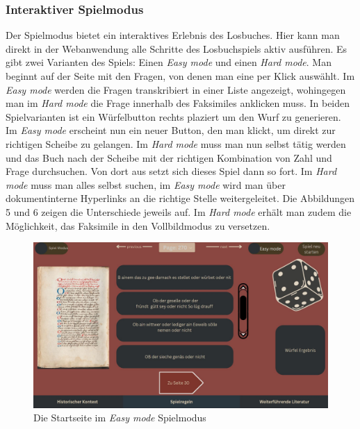 \documentclass[12pt,a4paper]{article}
\begin{document}
		\subsubsection{Interaktiver Spielmodus}
		Der Spielmodus bietet ein interaktives Erlebnis des Losbuches. Hier kann man direkt in der Webanwendung alle Schritte des Losbuchspiels aktiv ausführen.
		Es gibt zwei Varianten des Spiels: Einen \textit{Easy mode} und einen \textit{Hard mode}. Man beginnt auf der Seite mit den Fragen, von denen man eine per Klick 
		auswählt. Im \textit{Easy mode} werden die Fragen transkribiert in einer Liste angezeigt, wohingegen man im \textit{Hard mode} die Frage innerhalb des Faksimiles 
		anklicken muss. In beiden Spielvarianten ist ein Würfelbutton rechts plaziert um den Wurf zu generieren. Im \textit{Easy mode} erscheint nun ein neuer Button, den man 
		klickt, um direkt zur richtigen Scheibe zu gelangen. Im \textit{Hard mode} muss man nun selbst tätig werden und das Buch nach der Scheibe mit der richtigen Kombination
		von Zahl und Frage durchsuchen. Von dort aus setzt sich dieses Spiel dann so fort. Im \textit{Hard mode} muss man alles selbst suchen, im \textit{Easy mode} wird man über dokumentinterne Hyperlinks an die
		richtige Stelle weitergeleitet. Die Abbildungen 5 und 6 zeigen die Unterschiede jeweils auf. Im \textit{Hard mode} erhält man zudem die Möglichkeit, das Faksimile in den Vollbildmodus zu versetzen.
					\begin{figure}[htbp]
				\centering
				\includegraphics[scale=0.3]{ansicht-gamemodus-easy.JPG}
				\caption{Die Startseite im \textit{Easy mode} Spielmodus}
				\label{Abbildung 5}
			\end{figure}
\end{document}
